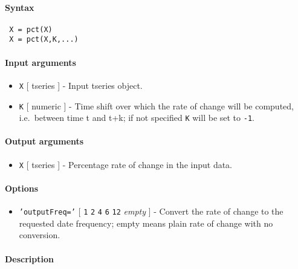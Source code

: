 


	\paragraph{Syntax}
 
 \begin{verbatim}
 X = pct(X)
 X = pct(X,K,...)
 \end{verbatim}
 
 \paragraph{Input arguments}
 
 \begin{itemize}
 \item
   \texttt{X} {[} tseries {]} - Input tseries object.
 \item
   \texttt{K} {[} numeric {]} - Time shift over which the rate of change
   will be computed, i.e.~between time t and t+k; if not specified
   \texttt{K} will be set to \texttt{-1}.
 \end{itemize}
 
 \paragraph{Output arguments}
 
 \begin{itemize}
 \item
   \texttt{X} {[} tseries {]} - Percentage rate of change in the input
   data.
 \end{itemize}
 
 \paragraph{Options}
 
 \begin{itemize}
 \item
   \texttt{'outputFreq='} {[} \texttt{1} \textbar{} \texttt{2} \textbar{}
   \texttt{4} \textbar{} \texttt{6} \textbar{} \texttt{12} \textbar{}
   \emph{empty} {]} - Convert the rate of change to the requested date
   frequency; empty means plain rate of change with no conversion.
 \end{itemize}
 
 \paragraph{Description}
 
